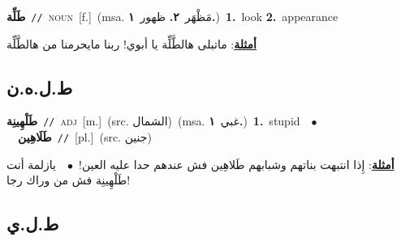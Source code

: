 \documentclass[10pt,a4paper,twoside]{article} %
\begin{document}
\begin{multicols}{2}
{\setlength\topsep{0pt}\textbf{\foreignlanguage{arabic}{طَلِّة}}\ {\color{gray}\texttt{//}\color{black}}\ \textsc{noun}\ [f.]\ \color{gray}(msa. \foreignlanguage{arabic}{مَظْهَر}~\foreignlanguage{arabic}{\textbf{٢.}}  \foreignlanguage{arabic}{ظهور}~\foreignlanguage{arabic}{\textbf{١.}})\color{black}\ \textbf{1.}~look  \textbf{2.}~appearance\  \begin{flushright}\color{gray}\foreignlanguage{arabic}{\textbf{\underline{\foreignlanguage{arabic}{أمثلة}}}: ماتبلى هالطَّلِّة يا أبوي! ربنا مايحرمنا من هالطَّلِّة}\end{flushright}\color{black}} \vspace{2mm}

\vspace{-3mm}
\subsection*{\color{blue}\foreignlanguage{arabic}{ط.ل.ه.ن}\color{blue}{ (ntws)}} 

{\setlength\topsep{0pt}\textbf{\foreignlanguage{arabic}{طَلْهِينِة}}\ {\color{gray}\texttt{//}\color{black}}\ \textsc{adj}\ [m.]\ (src. \color{gray}\foreignlanguage{arabic}{الشمال}\color{black})\ \color{gray}(msa. \foreignlanguage{arabic}{غبي}~\foreignlanguage{arabic}{\textbf{١.}})\color{black}\ \textbf{1.}~stupid\ \ $\bullet$\ \ \setlength\topsep{0pt}\textbf{\foreignlanguage{arabic}{طَلَاهِين}}\ {\color{gray}\texttt{//}\color{black}}\ [pl.]\ (src. \color{gray}\foreignlanguage{arabic}{جنين}\color{black})\  \begin{flushright}\color{gray}\foreignlanguage{arabic}{\textbf{\underline{\foreignlanguage{arabic}{أمثلة}}}: إِذا انتبهت بناتهم وشبابهم طَلاهِين فش عندهم حدا عليه العين!\ $\bullet$\ \  يازلمة أنت طَلْهِينِة فش من وراك رجا!}\end{flushright}\color{black}} \vspace{2mm}

\vspace{-3mm}
\subsection*{\color{blue}\foreignlanguage{arabic}{ط.ل.ي}\color{blue}{}} 


\end{multicols}
\end{document}
